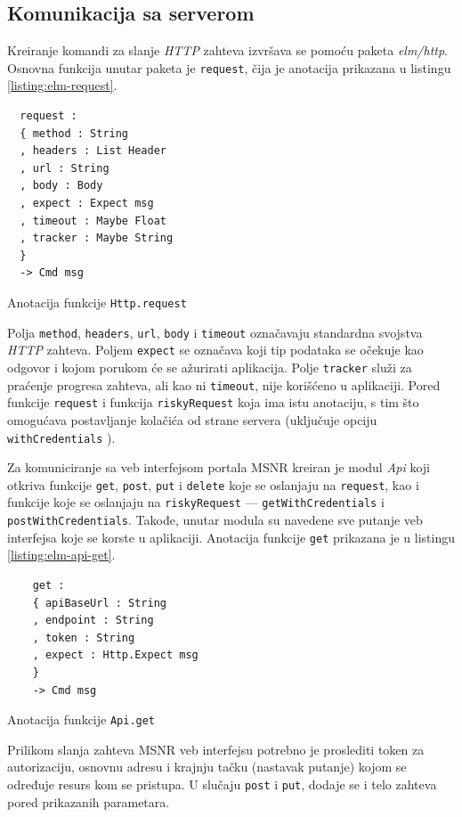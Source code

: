 \documentclass[12pt,oneside]{memoir}
\begin{document}
\subsection{Komunikacija sa serverom}
Kreiranje komandi za slanje \emph{HTTP} zahteva izvršava se pomoću paketa \emph{elm/http}.
Osnovna funkcija unutar paketa je \texttt{request}, čija je anotacija prikazana u listingu \ref{listing:elm-request}.
\begin{listing}[h]
\begin{verbatim}
  request :
  { method : String
  , headers : List Header
  , url : String
  , body : Body
  , expect : Expect msg
  , timeout : Maybe Float
  , tracker : Maybe String
  }
  -> Cmd msg
\end{verbatim}
\caption{Anotacija funkcije \texttt{Http.request}}
\label{listing:elm-request}
\end{listing}

Polja \texttt{method}, \texttt{headers}, \texttt{url}, \texttt{body} i \texttt{timeout} označavaju standardna
svojstva \emph{HTTP} zahteva. Poljem \texttt{expect} se označava koji tip podataka se očekuje kao odgovor i kojom porukom
će se ažurirati aplikacija. Polje \texttt{tracker} služi za praćenje progresa zahteva, ali kao ni \texttt{timeout},
nije korišćeno u aplikaciji. Pored funkcije \texttt{request} i funkcija \texttt{riskyRequest} koja ima istu anotaciju, s tim što omogućava
postavljanje kolačića od strane servera (uključuje opciju \texttt{withCredentials} \cite{withCredentials}).

Za komuniciranje sa veb interfejsom portala MSNR kreiran je modul \emph{Api} koji otkriva funkcije \texttt{get}, \texttt{post},
\texttt{put} i \texttt{delete} koje se oslanjaju na \texttt{request}, kao i funkcije koje se oslanjaju na
\texttt{riskyRequest} --- \texttt{getWithCredentials} i \texttt{postWithCredentials}. Takođe, unutar modula
su navedene sve putanje veb interfejsa koje se korste u aplikaciji.
Anotacija funkcije \texttt{get} prikazana je u listingu \ref{listing:elm-api-get}. 
\begin{listing}[h]
  \begin{verbatim}
    get :
    { apiBaseUrl : String
    , endpoint : String
    , token : String
    , expect : Http.Expect msg
    }
    -> Cmd msg
  \end{verbatim}
  \caption{Anotacija funkcije \texttt{Api.get}}
  \label{listing:elm-api-get}
  \end{listing}
Prilikom slanja zahteva MSNR veb interfejsu potrebno je proslediti token za autorizaciju,
osnovnu adresu i krajnju tačku (nastavak putanje) kojom se određuje resurs kom se pristupa.
U slučaju \texttt{post} i \texttt{put}, dodaje se i telo zahteva pored prikazanih parametara.
\end{document}
